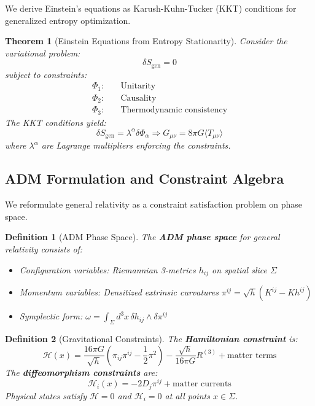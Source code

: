 \documentclass[11pt,a4paper]{article}
\newtheorem{theorem}{Theorem}[section]
\newtheorem{definition}{Definition}[section]
\theoremstyle{remark}
\theoremstyle{definition}
\begin{document}
We derive Einstein's equations as Karush-Kuhn-Tucker (KKT) conditions for generalized entropy optimization.

\begin{theorem}[Einstein Equations from Entropy Stationarity]
Consider the variational problem:
\begin{equation}
\delta S_{\text{gen}} = 0
\end{equation}
subject to constraints:
\begin{align}
\Phi_1: & \quad \text{Unitarity} \\
\Phi_2: & \quad \text{Causality} \\
\Phi_3: & \quad \text{Thermodynamic consistency}
\end{align}
The KKT conditions yield:
\begin{equation}
\delta S_{\text{gen}} = \lambda^\alpha \delta \Phi_\alpha \Rightarrow G_{\mu\nu} = 8\pi G \langle T_{\mu\nu} \rangle
\end{equation}
where $\lambda^\alpha$ are Lagrange multipliers enforcing the constraints.
\end{theorem}

\subsection{ADM Formulation and Constraint Algebra}

We reformulate general relativity as a constraint satisfaction problem on phase space.

\begin{definition}[ADM Phase Space]
The \textbf{ADM phase space} for general relativity consists of:
\begin{itemize}
\item Configuration variables: Riemannian 3-metrics $h_{ij}$ on spatial slice $\Sigma$
\item Momentum variables: Densitized extrinsic curvatures $\pi^{ij} = \sqrt{h}(K^{ij} - K h^{ij})$
\item Symplectic form: $\omega = \int_\Sigma d^3x \, \delta h_{ij} \wedge \delta \pi^{ij}$
\end{itemize}
\end{definition}

\begin{definition}[Gravitational Constraints]
The \textbf{Hamiltonian constraint} is:
\begin{equation}
\mathcal{H}(x) = \frac{16\pi G}{\sqrt{h}}\left(\pi_{ij}\pi^{ij} - \frac{1}{2}\pi^2\right) - \frac{\sqrt{h}}{16\pi G}R^{(3)} + \text{matter terms}
\end{equation}
The \textbf{diffeomorphism constraints} are:
\begin{equation}
\mathcal{H}_i(x) = -2 D_j \pi^{ij} + \text{matter currents}
\end{equation}
Physical states satisfy $\mathcal{H} = 0$ and $\mathcal{H}_i = 0$ at all points $x \in \Sigma$.
\end{definition}
\end{document}
